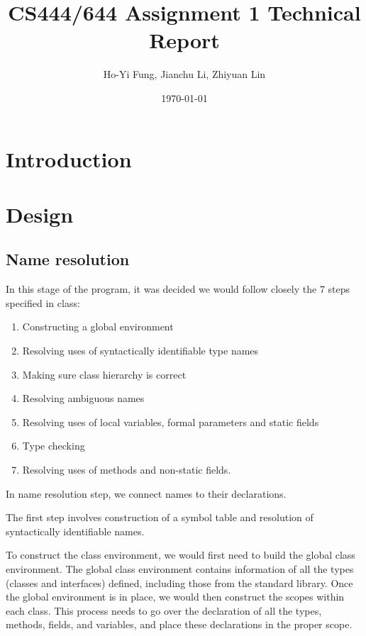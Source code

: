 \documentclass[a4paper, notitlepage]{report}
\title{CS444/644 Assignment 1 Technical Report}
\author{Ho-Yi Fung, Jianchu Li, Zhiyuan Lin}
\date{\today}
\begin{document}
{\let\newpage\relax\maketitle}
\begin{abstract}

\end{abstract}


\tableofcontents

\newpage

\chapter{Introduction}

\chapter{Design}

\section{Name resolution}

In this stage of the program, it was decided we would follow closely the 7 steps specified in class:
\begin{enumerate}
	\item Constructing a global environment
	\item Resolving uses of syntactically identifiable type names
	\item Making sure class hierarchy is correct
	\item Resolving ambiguous names
	\item Resolving uses of local variables, formal parameters and static fields
	\item Type checking
	\item Resolving uses of methods and non-static fields.
\end{enumerate}

In name resolution step, we connect names to their declarations.

The first step involves construction of a symbol table and resolution of syntactically identifiable names.

To construct the class environment, we would first need to build the global class environment. The global class environment contains information of all the types (classes and interfaces) defined, including those from the standard library. Once the global environment is in place, we would then construct the scopes within each class. This process  needs to go over the declaration of all the types, methods, fields, and variables, and place these declarations in the proper scope.
\end{document}
